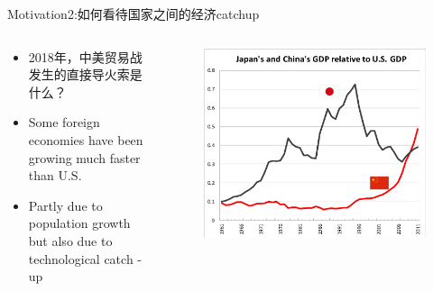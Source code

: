 \documentclass[10pt,hyperref={CJKbookmarks=true},xcolor=dvipsnames,aspectratio=169]{beamer}
\begin{document}
\begin{frame}{Motivation2:如何看待国家之间的经济catchup}


\begin{columns}[onlytextwidth]
	\begin{column}{0.4\textwidth}
		\begin{itemize}
			\item 2018年，中美贸易战发生的直接导火索是什么？
			\item Some foreign economies have been growing much faster than U.S. 
			\item Partly due to population growth but also due to technological catch
			-up
		\end{itemize}
		
	\end{column}
	\begin{column}{0.6\textwidth}
\begin{figure}
	\centering
	\includegraphics[width=0.7\linewidth]{fig/ricardo/lec3-00}

\end{figure}
	\end{column}
\end{columns}

\end{frame}
\end{document}
